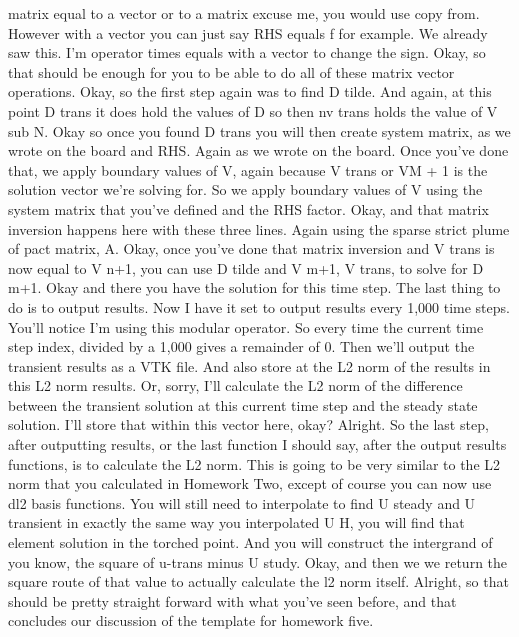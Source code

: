 \documentclass[10pt]{article}
\begin{document}
matrix equal to a vector or to a matrix excuse me, you would use copy from. However with a vector you can just say RHS equals f for example. We already saw this. I'm operator times equals with a vector to change the sign. Okay, so that should be enough for you to be able to do all of these matrix vector operations. Okay, so the first step again was to find D tilde. And again, at this point D trans it does hold the values of D so then nv trans holds the value of V sub N. Okay so once you found D trans you will then create system matrix, as we wrote on the board and RHS. Again as we wrote on the board. Once you've done that, we apply boundary values of V, again because V trans or VM + 1 is the solution vector we're solving for. So we apply boundary values of V using the system matrix that you've defined and the RHS factor. Okay, and that matrix inversion happens here with these three lines. Again using the sparse strict plume of pact matrix, A. Okay, once you've done that matrix inversion and V trans is now equal to V n+1, you can use D tilde and V m+1, V trans, to solve for D m+1. Okay and there you have the solution for this time step. The last thing to do is to output results. Now I have it set to output results every 1,000 time steps. You'll notice I'm using this modular operator. So every time the current time step index, divided by a 1,000 gives a remainder of 0. Then we'll output the transient results as a VTK file. And also store at the L2 norm of the results in this L2 norm results. Or, sorry, I'll calculate the L2 norm of the difference between the transient solution at this current time step and the steady state solution. I'll store that within this vector here, okay? Alright. So the last step, after outputting results, or the last function I should say, after the output results functions, is to calculate the L2 norm. This is going to be very similar to the L2 norm that you calculated in Homework Two, except of course you can now use dl2 basis functions. You will still need to interpolate to find U steady and U transient in exactly the same way you interpolated U H, you will find that element solution in the torched point. And you will construct the intergrand of you know, the square of u-trans minus U study. Okay, and then we we return the square route of that value to actually calculate the l2 norm itself. Alright, so that should be pretty straight forward with what you've seen before, and that concludes our discussion of the template for homework five.
\end{document}
